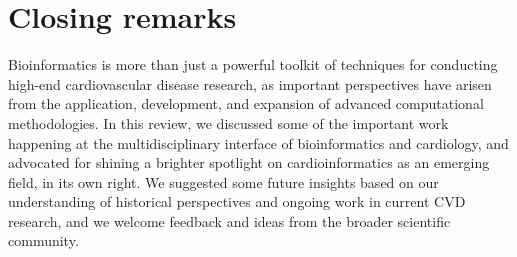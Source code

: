 \documentclass[letter]{bioinfo}
\begin{document}

	
	

	
	
	
	
	


	
	
	
	
	\section*{Closing remarks}
Bioinformatics is more than just a powerful toolkit of techniques for conducting high-end cardiovascular disease research, as important perspectives have arisen from the application, development, and expansion of advanced computational methodologies.  In this review, we discussed some of the important work happening at the multidisciplinary interface of bioinformatics and cardiology, and advocated for shining a brighter spotlight on cardioinformatics as an emerging field, in its own right.  We suggested some future insights based on our understanding of historical perspectives and ongoing work in current CVD research, and we welcome feedback and ideas from the broader scientific community.
\end{document}
